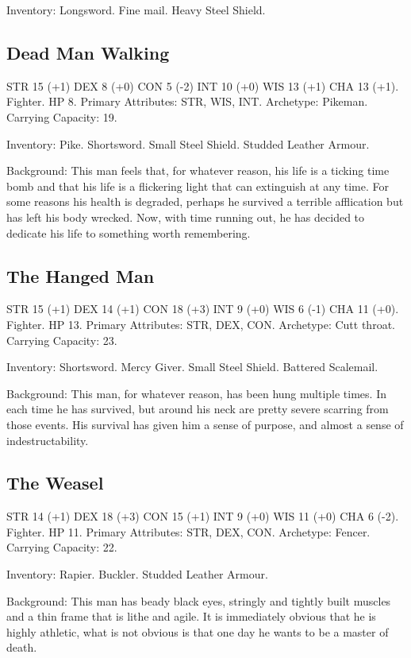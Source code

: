         Inventory: Longsword. Fine mail. Heavy Steel Shield. 
        \subsection{Dead Man Walking} STR 15 (+1) DEX 8 (+0) CON 5 (-2) INT 10 (+0) WIS 13 (+1) CHA 13 (+1). Fighter. HP 8. Primary Attributes: STR, WIS, INT. Archetype: Pikeman. Carrying Capacity: 19. 
        
        Inventory: Pike. Shortsword. Small Steel Shield. Studded Leather Armour.
        
        Background: This man feels that, for whatever reason, his life is a ticking time bomb and that his life is a flickering light that can extinguish at any time. For some reasons his health is degraded, perhaps he survived a terrible afflication but has left his body wrecked. Now, with time running out, he has decided to dedicate his life to something worth remembering. 
        
        \subsection{The Hanged Man} STR 15 (+1) DEX 14 (+1) CON 18 (+3) INT 9 (+0) WIS 6 (-1) CHA 11 (+0). Fighter. HP 13. Primary Attributes: STR, DEX, CON. Archetype: Cutt throat. Carrying Capacity: 23. 
        
        Inventory: Shortsword. Mercy Giver. Small Steel Shield. Battered Scalemail.
        
        Background: This man, for whatever reason, has been hung multiple times. In each time he has survived, but around his neck are pretty severe scarring from those events. His survival has given him a sense of purpose, and almost a sense of indestructability. 
        
        \subsection{The Weasel} STR 14 (+1) DEX 18 (+3) CON 15 (+1) INT 9 (+0) WIS 11 (+0) CHA 6 (-2). Fighter. HP 11. Primary Attributes: STR, DEX, CON. Archetype: Fencer. Carrying Capacity: 22. 
        
        Inventory: Rapier. Buckler. Studded Leather Armour.   
        
        Background: This man has beady black eyes, stringly and tightly built muscles and a thin frame that is lithe and agile. It is immediately obvious that he is highly athletic, what is not obvious is that one day he wants to be a master of death.
